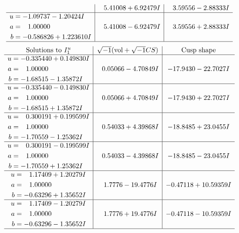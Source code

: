 \documentclass[1p]{elsarticle_modified}
\theoremstyle{definition}
\newcommand{\I}{\sqrt{-1}}
\begin{document}
$$\begin{array}{c|c|c}
 & \phantom{-}5.41008 + 6.92479 I & \phantom{-}3.59556 - 2.88333 I \\ \hline\begin{aligned}
u &= -1.09737 - 1.20424 I \\
a &= \phantom{-}1.00000\phantom{ +0.000000I} \\
b &= -0.586826 + 1.223610 I\end{aligned}
 & \phantom{-}5.41008 - 6.92479 I & \phantom{-}3.59556 + 2.88333 I\\
 \hline 
 \end{array}$$\newpage$$\begin{array}{c|c|c}  
\text{Solutions to }I^u_{1}& \I (\text{vol} + \sqrt{-1}CS) & \text{Cusp shape}\\
 \hline 
\begin{aligned}
u &= -0.335440 + 0.149830 I \\
a &= \phantom{-}1.00000\phantom{ +0.000000I} \\
b &= -1.68515 - 1.35872 I\end{aligned}
 & \phantom{-}0.05066 - 4.70849 I & -17.9430 - 22.7027 I \\ \hline\begin{aligned}
u &= -0.335440 - 0.149830 I \\
a &= \phantom{-}1.00000\phantom{ +0.000000I} \\
b &= -1.68515 + 1.35872 I\end{aligned}
 & \phantom{-}0.05066 + 4.70849 I & -17.9430 + 22.7027 I \\ \hline\begin{aligned}
u &= \phantom{-}0.300191 + 0.199599 I \\
a &= \phantom{-}1.00000\phantom{ +0.000000I} \\
b &= -1.70559 - 1.25362 I\end{aligned}
 & \phantom{-}0.54033 + 4.39868 I & -18.8485 + 23.0455 I \\ \hline\begin{aligned}
u &= \phantom{-}0.300191 - 0.199599 I \\
a &= \phantom{-}1.00000\phantom{ +0.000000I} \\
b &= -1.70559 + 1.25362 I\end{aligned}
 & \phantom{-}0.54033 - 4.39868 I & -18.8485 - 23.0455 I \\ \hline\begin{aligned}
u &= \phantom{-}1.17409 + 1.20279 I \\
a &= \phantom{-}1.00000\phantom{ +0.000000I} \\
b &= -0.63296 + 1.35652 I\end{aligned}
 & \phantom{-}1.7776 - 19.4776 I & -0.47118 + 10.59359 I \\ \hline\begin{aligned}
u &= \phantom{-}1.17409 - 1.20279 I \\
a &= \phantom{-}1.00000\phantom{ +0.000000I} \\
b &= -0.63296 - 1.35652 I\end{aligned}
 & \phantom{-}1.7776 + 19.4776 I & -0.47118 - 10.59359 I\\
 \hline 
 \end{array}$$\newpage\newpage\renewcommand{\arraystretch}{1}
\end{document}

